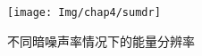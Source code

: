  \begin{figure}[!htbp]
  \centering
   \texttt{[image: Img/chap4/sumdr]}
    \caption{不同暗噪声率情况下的能量分辨率}
  \label{fig:dr}
\end{figure}
%
